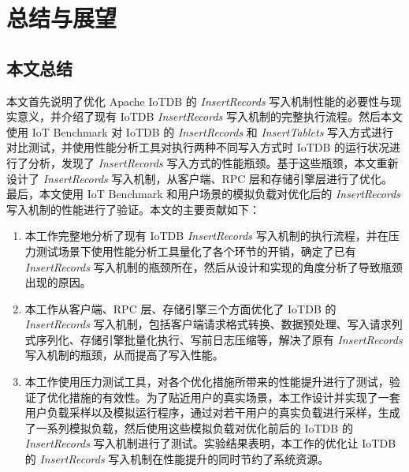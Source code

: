 
\chapter{总结与展望}
\section{本文总结}
本文首先说明了优化 Apache IoTDB 的 \emph{InsertRecords} 写入机制性能的必要性与现实意义，并介绍了现有 IoTDB \emph{InsertRecords} 写入机制的完整执行流程。然后本文使用 IoT Benchmark 对 IoTDB 的 \emph{InsertRecords} 和 \emph{InsertTablets} 写入方式进行对比测试，并使用性能分析工具对执行两种不同写入方式时 IoTDB 的运行状况进行了分析，发现了 \emph{InsertRecords} 写入方式的性能瓶颈。基于这些瓶颈，本文重新设计了 \emph{InsertRecords} 写入机制，从客户端、RPC 层和存储引擎层进行了优化。最后，本文使用 IoT Benchmark 和用户场景的模拟负载对优化后的 \emph{InsertRecords} 写入机制的性能进行了验证。本文的主要贡献如下：
\begin{enumerate}
  \item 本工作完整地分析了现有 IoTDB \emph{InsertRecords} 写入机制的执行流程，并在压力测试场景下使用性能分析工具量化了各个环节的开销，确定了已有 \emph{InsertRecords} 写入机制的瓶颈所在，然后从设计和实现的角度分析了导致瓶颈出现的原因。
  \item 本工作从客户端、RPC 层、存储引擎三个方面优化了 IoTDB 的 \emph{InsertRecords} 写入机制，包括客户端请求格式转换、数据预处理、写入请求列式序列化、存储引擎批量化执行、写前日志压缩等，解决了原有 \emph{InsertRecords} 写入机制的瓶颈，从而提高了写入性能。
  \item 本工作使用压力测试工具，对各个优化措施所带来的性能提升进行了测试，验证了优化措施的有效性。为了贴近用户的真实场景，本工作设计并实现了一套用户负载采样以及模拟运行程序，通过对若干用户的真实负载进行采样，生成了一系列模拟负载，然后使用这些模拟负载对优化前后的 IoTDB 的 \emph{InsertRecords} 写入机制进行了测试。实验结果表明，本工作的优化让 IoTDB 的 \emph{InsertRecords} 写入机制在性能提升的同时节约了系统资源。
\end{enumerate}
